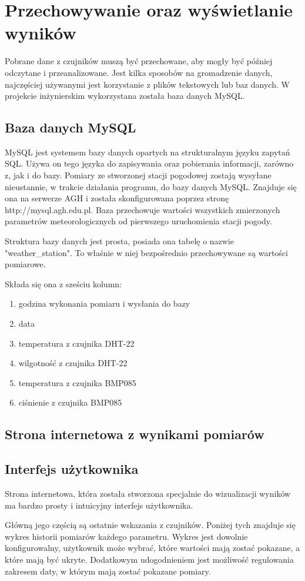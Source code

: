 \chapter{Przechowywanie oraz wyświetlanie wyników}

Pobrane dane z czujników muszą być przechowane, aby mogły być później odczytane i przeanalizowane. Jest kilka sposobów na gromadzenie danych, najczęściej używanymi jest korzystanie z plików tekstowych lub baz danych. W projekcie inżynierskim wykorzystana została baza danych MySQL. 

\section{Baza danych MySQL}
MySQL jest systemem bazy danych opartych na strukturalnym języku zapytań SQL. Używa on tego języka do zapisywania oraz pobierania informacji, zarówno z, jak i do bazy. 
Pomiary ze stworzonej stacji pogodowej zostają wysyłane nieustannie, w trakcie działania programu, do bazy danych MySQL. Znajduje się ona na serwerze AGH i została skonfigurowana poprzez stronę http://mysql.agh.edu.pl. Baza przechowuje wartości wszystkich zmierzonych parametrów meteorologicznych od pierwszego uruchomienia stacji pogody.

Struktura bazy danych jest prosta, posiada ona tabelę o nazwie "weather\_station". To właśnie w niej bezpośrednio przechowywane są wartości pomiarowe.

Składa się ona z sześciu kolumn:
\begin{enumerate}
\item godzina wykonania pomiaru i wysłania do bazy
\item data
\item temperatura z czujnika DHT-22
\item wilgotność z czujnika DHT-22
\item temperatura z czujnika BMP085
\item ciśnienie z czujnika BMP085
\end{enumerate}

\section{Strona internetowa z wynikami pomiarów}

\section{Interfejs użytkownika}
Strona internetowa, która została stworzona specjalnie do wizualizacji wyników ma bardzo prosty i intuicyjny interfejs użytkownika.

Główną jego częścią są ostatnie wskazania z czujników. Poniżej tych znajduje się wykres historii pomiarów każdego parametru. Wykres jest dowolnie konfigurowalny, użytkownik może wybrać, które wartości mają zostać pokazane, a które mają być ukryte. Dodatkowym udogodnieniem jest możliwość regulowania zakresem daty, w którym mają zostać pokazane pomiary.

